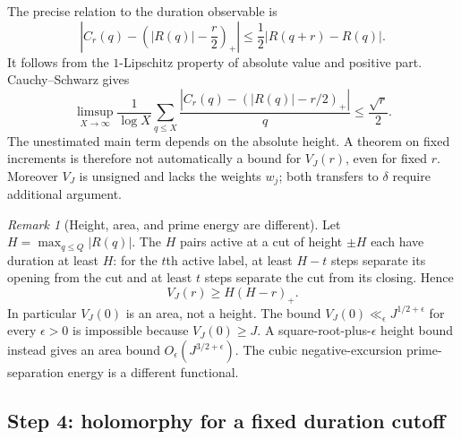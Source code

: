 \documentclass[11pt]{amsart}
\numberwithin{equation}{section}
\theoremstyle{plain}
\theoremstyle{definition}
\theoremstyle{remark}
\newtheorem{remark}[theorem]{Remark}
\begin{document}
The precise relation to the duration observable is
\begin{equation}
\label{eq:a12-local-error}
\left|C_r(q)-\left(|R(q)|-\frac r2\right)_+\right|
\le\frac12|R(q+r)-R(q)|.
\end{equation}
It follows from the $1$-Lipschitz property of absolute value and positive part.
Cauchy--Schwarz gives
\begin{equation}
\label{eq:a12-local-average}
\limsup_{X\to\infty}\frac1{\log X}
\sum_{q\le X}\frac{|C_r(q)-(|R(q)|-r/2)_+|}{q}
\le\frac{\sqrt r}{2}.
\end{equation}
The unestimated main term depends on the absolute height. A theorem on
fixed increments is therefore not automatically a bound for $V_J(r)$,
even for fixed $r$. Moreover $V_J$ is unsigned and lacks the weights $w_j$;
both transfers to $\delta$ require additional argument.

\begin{remark}[Height, area, and prime energy are different]
\label{rem:a12-scales}
Let $H=\max_{q\le Q}|R(q)|$. The $H$ pairs active at a cut of height
$\pm H$ each have duration at least $H$: for the $t$th active label,
at least $H-t$ steps separate its opening from the cut and at least $t$
steps separate the cut from its closing. Hence
\begin{equation}
\label{eq:a12-V-height}
V_J(r)\ge H(H-r)_+.
\end{equation}
In particular $V_J(0)$ is an area, not a height.
The bound $V_J(0)\ll_\epsilon J^{1/2+\epsilon}$ for every $\epsilon>0$
is impossible because $V_J(0)\ge J$.
A square-root-plus-$\epsilon$ height bound instead gives an area bound
$O_\epsilon(J^{3/2+\epsilon})$.
The cubic negative-excursion prime-separation energy is a different functional.
\end{remark}

\subsection{Step 4: holomorphy for a fixed duration cutoff}
\label{subsec:a12-short-pairs}
\end{document}
